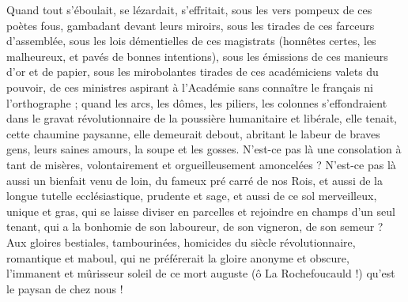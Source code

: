 \documentclass[french,twoside]{book} %
\begin{document}
Quand tout s’éboulait, se lézardait, s’effritait, sous les vers pompeux de ces poètes fous, gambadant devant leurs miroirs, sous les tirades de ces farceurs d’assemblée, sous les lois démentielles de ces magistrats (honnêtes certes, les malheureux, et pavés de bonnes intentions), sous les émissions de ces manieurs d’or et de papier, sous les mirobolantes tirades de ces académiciens valets du pouvoir, de ces ministres aspirant à l’Académie sans connaître le français ni l’orthographe ; quand les arcs, les dômes, les piliers, les colonnes s’effondraient dans le gravat révolutionnaire de la poussière humanitaire et libérale, elle tenait, cette chaumine paysanne, elle demeurait debout, abritant le labeur de braves gens, leurs saines amours, la soupe et les gosses. N’est-ce pas là une consolation à tant de misères, volontairement et orgueilleusement amoncelées ? N’est-ce pas là aussi un bienfait venu de loin, du fameux pré carré de nos Rois, et aussi de la longue tutelle ecclésiastique, prudente et sage, et aussi de ce sol merveilleux, unique et gras, qui se laisse diviser en parcelles et rejoindre en champs d’un seul tenant, qui a la bonhomie de son laboureur, de son vigneron, de son semeur ? Aux gloires bestiales, tambourinées, homicides du siècle révolutionnaire, romantique et maboul, qui ne préférerait la gloire anonyme et obscure, l’immanent et mûrisseur soleil de ce mort auguste (ô La Rochefoucauld !) qu’est le paysan de chez nous !\par
\end{document}
